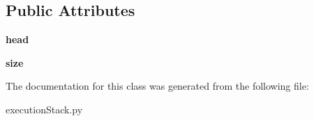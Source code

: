 \subsection*{Public Attributes}
\begin{DoxyCompactItemize}
\item 
{\bfseries head}\hypertarget{classexecution_stack_1_1_execution_stack_ad712e443c44369cb1de23bb4010c89f3}{}\label{classexecution_stack_1_1_execution_stack_ad712e443c44369cb1de23bb4010c89f3}

\item 
{\bfseries size}\hypertarget{classexecution_stack_1_1_execution_stack_a7011596156e1e3128bb44099347b5db8}{}\label{classexecution_stack_1_1_execution_stack_a7011596156e1e3128bb44099347b5db8}

\end{DoxyCompactItemize}


The documentation for this class was generated from the following file\+:\begin{DoxyCompactItemize}
\item 
execution\+Stack.\+py\end{DoxyCompactItemize}
